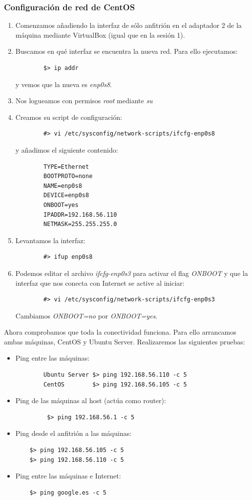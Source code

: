 \documentclass[12pt,spanish]{article}
\begin{document}
\subsubsection{Configuración de red de CentOS}
\begin{enumerate}
	\item Comenzamos añadiendo la interfaz de sólo anfitrión en el adaptador 2 de la máquina mediante VirtualBox (igual que en la sesión 1).
	\item Buscamos en qué interfaz se encuentra la nueva red. Para ello ejecutamos:
	\begin{lstlisting}
		$> ip addr
	\end{lstlisting}
	y vemos que la nueva es \textit{enp0s8}.
	\item Nos logueamos con permisos \textit{root} mediante \textit{su}
	\item Creamos su script de configuración:
	\begin{lstlisting}
		#> vi /etc/sysconfig/network-scripts/ifcfg-enp0s8
	\end{lstlisting}
	y añadimos el siguiente contenido:
	\begin{lstlisting}
		TYPE=Ethernet
		BOOTPROTO=none
		NAME=enp0s8
		DEVICE=enp0s8
		ONBOOT=yes
		IPADDR=192.168.56.110
		NETMASK=255.255.255.0
	\end{lstlisting}
	\item Levantamos la interfaz:
	\begin{lstlisting}
		#> ifup enp0s8
	\end{lstlisting}
	\item Podemos editar el archivo \textit{ifcfg-enp0s3} para activar el flag \textit{ONBOOT} y que la interfaz que nos conecta con Internet se active al iniciar:
	\begin{lstlisting}
		#> vi /etc/sysconfig/network-scripts/ifcfg-enp0s3
	\end{lstlisting}
	Cambiamos \textit{ONBOOT=no} por \textit{ONBOOT=yes}.
\end{enumerate}
Ahora comprobamos que toda la conectividad funciona. Para ello arrancamos ambas máquinas, CentOS y Ubuntu Server. Realizaremos las siguientes pruebas:
\begin{itemize}
	\item Ping entre las máquinas:
	\begin{lstlisting}
		Ubuntu Server $> ping 192.168.56.110 -c 5
		CentOS        $> ping 192.168.56.105 -c 5
	\end{lstlisting}
	\item Ping de las máquinas al host (actúa como router):
	\begin{lstlisting}
		 $> ping 192.168.56.1 -c 5
	\end{lstlisting}
	\item Ping desde el anfitrión a las máquinas:
	\begin{lstlisting}
	$> ping 192.168.56.105 -c 5
	$> ping 192.168.56.110 -c 5
	\end{lstlisting}
	\item Ping entre las máquinas e Internet:
	\begin{lstlisting}
	$> ping google.es -c 5
	\end{lstlisting}
\end{itemize}
\end{document}
